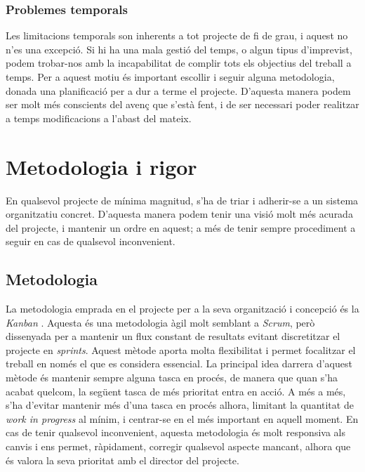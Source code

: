 \documentclass[a4paper]{report}
\begin{document}
	\subsubsection{Problemes temporals}
	Les limitacions temporals son inherents a tot projecte de fi de grau, i aquest no n'es una excepció. Si hi ha una mala gestió del temps, o algun tipus d'imprevist, podem trobar-nos amb la incapabilitat de complir tots els objectius del treball a temps. \newline
	Per a aquest motiu és important escollir i seguir alguna metodologia, donada una planificació per a dur a terme el projecte. D'aquesta manera podem ser molt més conscients del avenç que s'està fent, i de ser necessari poder realitzar a temps modificacions a l'abast del mateix.
	
	\section{Metodologia i rigor}
	En qualsevol projecte de mínima magnitud, s'ha de triar i adherir-se a un sistema organitzatiu concret. D'aquesta manera podem tenir una visió molt més acurada del projecte, i mantenir un ordre en aquest; a més de tenir sempre procediment a seguir en cas de qualsevol inconvenient.
	\subsection{Metodologia}
	La metodologia emprada en el projecte per a la seva organització i concepció és la \textit{Kanban} \cite{Gould2012}. Aquesta és una metodologia àgil molt semblant a \textit{Scrum}, però dissenyada per a mantenir un flux constant de resultats evitant discretitzar el projecte en \textit{sprints}. Aquest mètode aporta molta flexibilitat i permet focalitzar el treball en només el que es considera essencial.
	\newline
	La principal idea darrera d'aquest mètode és mantenir sempre alguna tasca en procés, de manera que quan s'ha acabat quelcom, la següent tasca de més prioritat entra en acció. A més a més, s'ha d'evitar mantenir més d'una tasca en procés alhora, limitant la quantitat de \textit{work in progress} al mínim, i centrar-se en el més important en aquell moment.
	\newline
	En cas de tenir qualsevol inconvenient, aquesta metodologia és molt responsiva als canvis i ens permet, ràpidament, corregir qualsevol aspecte mancant, alhora que és valora la seva prioritat amb el director del projecte.
	
\end{document}
